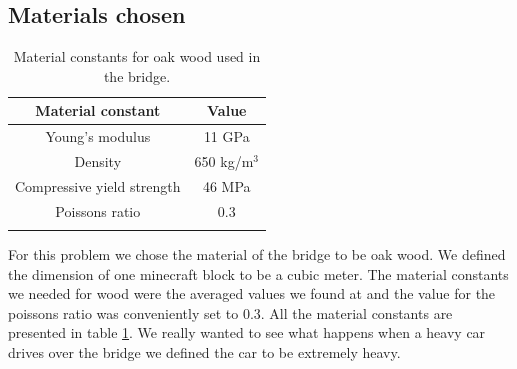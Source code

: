 \subsection{Materials chosen}
\begin{table}
\center
\caption{Material constants for oak wood used in the bridge.} 
\begin{tabular}{cc}
Material constant & Value \\ 
\hline 
Young's modulus & 11 GPa \\ 
Density & 650 kg/m$^3$ \\ 
Compressive yield strength & 46 MPa \\ 
Poissons ratio & 0.3 \\ 
\label{tab:oak}
\end{tabular}
\end{table}


For this problem we chose the material of the bridge to be oak wood. We defined the dimension of one minecraft block to be a cubic meter. The material constants we needed for wood were the averaged values we found at \cite{oak} and the value for the poissons ratio was conveniently set to 0.3. All the material constants are presented in table \ref{tab:oak}. We really wanted to see what happens when a heavy car drives over the bridge we defined the car to be extremely heavy.

